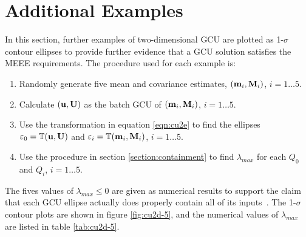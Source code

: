 \section{Additional Examples}\label{section:examples}

In this section, further examples of two-dimensional GCU are plotted as 1-$\sigma$ contour ellipses to provide further
evidence that a GCU solution satisfies the MEEE requirements. The procedure used for each example is:
\begin{enumerate}
    \item Randomly generate five mean and covariance estimates, $(\mathbf{m}_i,\mathbf{M}_i)$, $i=1\dots 5$.
    \item Calculate $(\mathbf{u},\mathbf{U})$ as the batch GCU of $(\mathbf{m}_i,\mathbf{M}_i)$, $i=1\dots 5$.
    \item Use the transformation in equation \ref{eqn:cu2e} to find the ellipses $\varepsilon_0=\mathbb{T}(\mathbf{u},\mathbf{U})$
        and $\varepsilon_i=\mathbb{T}(\mathbf{m}_i,\mathbf{M}_i)$, $i=1\dots 5$.
    \item Use the procedure in section \ref{section:containment} to find $\lambda_{max}$ for each $Q_0$ and $Q_i$,
        $i=1\dots 5$.
\end{enumerate}
The fives values of $\lambda_{max}\leq 0$ are given as numerical results to support the claim that each GCU ellipse
actually does properly contain all of its inputs~\cite{eberly00}. The 1-$\sigma$ contour plots are shown in figure
\ref{fig:cu2d-5}, and the numerical values of $\lambda_{max}$ are listed in table \ref{tab:cu2d-5}.

